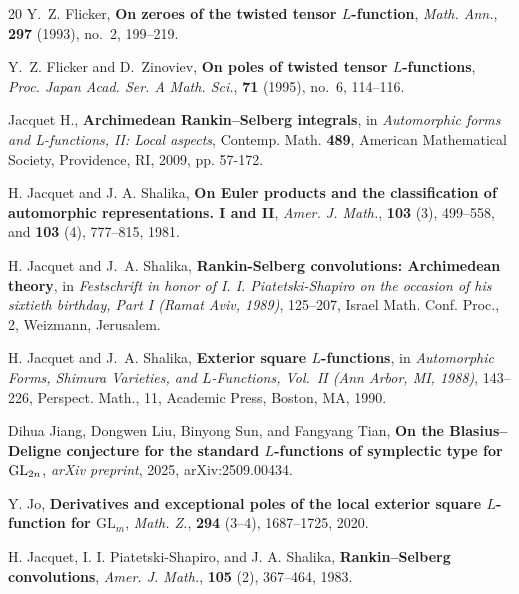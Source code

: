 \documentclass[12pt,reqno]{amsart}
\numberwithin{equation}{section}%
\numberwithin{equation}{subsection}
\theoremstyle{definition}
\theoremstyle{remark}
\begin{document}
{\begin{thebibliography}{20}
Y.~Z. Flicker, \textbf{On zeroes of the twisted tensor $L$-function},
\textit{Math. Ann.}, \textbf{297} (1993), no.~2, 199--219.

Y.~Z. Flicker and D.~Zinoviev, \textbf{On poles of twisted tensor $L$-functions},
\textit{Proc. Japan Acad. Ser. A Math. Sci.}, \textbf{71} (1995), no.~6, 114--116.


Jacquet H., \textbf{Archimedean Rankin--Selberg integrals}, in \textit{Automorphic forms and L-functions, II: Local aspects}, Contemp. Math. \textbf{489}, American Mathematical Society, Providence, RI, 2009, pp. 57-172.

H. Jacquet and J. A. Shalika,
\textbf{On Euler products and the classification of automorphic
representations. I and II},
\textit{Amer. J. Math.}, \textbf{103} (3), 499--558, and
\textbf{103} (4), 777--815, 1981.

H. Jacquet and J.~A. Shalika, \textbf{Rankin-Selberg convolutions: Archimedean theory}, in {\it Festschrift in honor of I. I. Piatetski-Shapiro on the occasion of his sixtieth birthday, Part I (Ramat Aviv, 1989)}, 125--207, Israel Math. Conf. Proc., 2, Weizmann, Jerusalem.

H. Jacquet and J.~A. Shalika, \textbf{Exterior square \(L\)-functions},
in {\it Automorphic Forms, Shimura Varieties, and \(L\)-Functions,
Vol.~II (Ann Arbor, MI, 1988)}, 143--226, Perspect. Math., 11,
Academic Press, Boston, MA, 1990.

Dihua Jiang, Dongwen Liu, Binyong Sun, and Fangyang Tian,
\textbf{On the Blasius--Deligne conjecture for the standard
\(L\)-functions of symplectic type for \({\rm GL}_{2n}\)},
\textit{arXiv preprint}, 2025, arXiv:2509.00434.

Y. Jo,
\textbf{Derivatives and exceptional poles of the local exterior
square \(L\)-function for \(\mathrm{GL}_m\)},
\textit{Math. Z.}, \textbf{294} (3--4), 1687--1725, 2020.

H. Jacquet, I. I. Piatetski-Shapiro, and J. A. Shalika,
\textbf{Rankin--Selberg convolutions},
\textit{Amer. J. Math.}, \textbf{105} (2), 367--464, 1983.


\end{thebibliography}}
\end{document}
